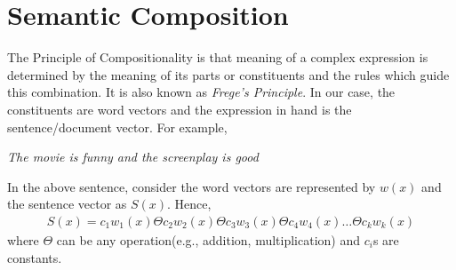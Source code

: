 \section{Semantic Composition}
\label{sec:composition}
The Principle of Compositionality is that meaning of a complex expression is determined by the meaning of its parts or constituents and the rules which guide this combination. It is also known as \emph{Frege's Principle}. In our case, the constituents are word vectors and the expression in hand is the sentence/document vector. For example,
\begin{center}
\emph{The movie is funny and the screenplay is good}
\end{center}
In the above sentence, consider the word vectors are represented by $w(x)$ and the sentence vector as $S(x)$. Hence,
\begin{align}
S(x) = c_1w_1(x) \Theta c_2w_2(x) \Theta c_3w_3(x) \Theta c_4w_4(x) \dots \Theta c_kw_k(x)
\end{align}
where $\Theta$ can be any operation(e.g., addition, multiplication) and $c_i$s are constants.

